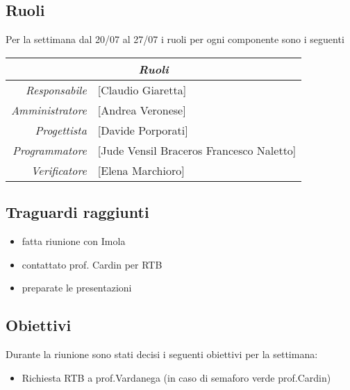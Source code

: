 \documentclass[12pt]{article}
\begin{document}
\subsection{Ruoli}
Per la settimana dal 20/07 al 27/07 i ruoli per ogni componente sono i seguenti
\\
\begin{tabular}{r | l}
    \multicolumn{2}{c}{\textit{Ruoli}}\\
    \hline
    \textit{Responsabile} &
    [Claudio Giaretta]\makecell{}\\
    \textit{Amministratore} &
    [Andrea Veronese]\makecell{}\\
    \textit{Progettista} &
    [Davide Porporati]\makecell{}\\
    \textit{Programmatore} &
    [Jude Vensil Braceros Francesco Naletto]\makecell{}\\
    \textit{Verificatore} & 
    [Elena Marchioro]\makecell{}\\
\end{tabular}

\subsection{Traguardi raggiunti}
\begin{itemize}
    \item fatta riunione con Imola
    \item contattato prof. Cardin per RTB
    \item preparate le presentazioni
    
\end{itemize}

\subsection{Obiettivi}
Durante la riunione sono stati decisi i seguenti obiettivi per la settimana:
\begin{itemize}
    \item Richiesta RTB a prof.Vardanega (in caso di semaforo verde prof.Cardin)

\end{itemize}
\end{document}
